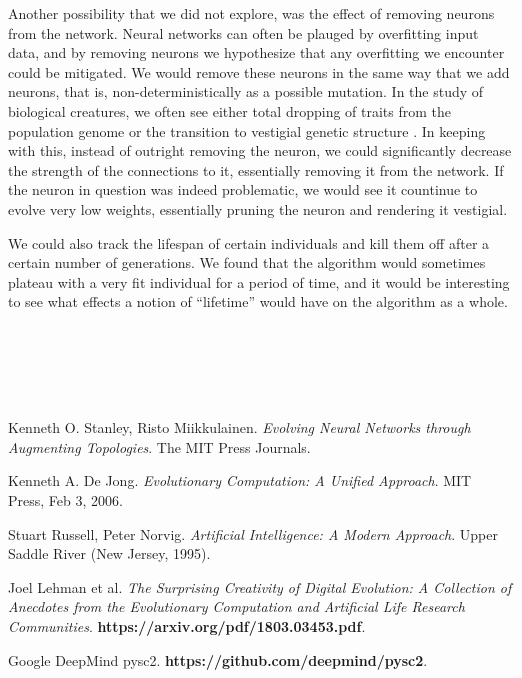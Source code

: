 \documentclass{article}
\begin{document}
\begin{multicols}{2}
Another possibility that we did not explore, was the effect of removing neurons
from the network. Neural networks can often be plauged by overfitting input
data, and by removing neurons we hypothesize that any overfitting we encounter
could be mitigated. We would remove these neurons in the same way that we add
neurons, that is, non-deterministically as a possible mutation. In the study of
biological creatures, we often see either total dropping of traits from the
population genome or the transition to vestigial genetic structure
\cite{lehman}. In keeping with this, instead of outright removing the neuron, we
could significantly decrease the strength of the connections to it, essentially
removing it from the network. If the neuron in question was indeed problematic,
we would see it countinue to evolve very low weights, essentially pruning the
neuron and rendering it vestigial.

We could also track the lifespan of certain individuals and kill them off after
a certain number of generations. We found that the algorithm would sometimes
plateau with a very fit individual for a period of time, and it would be
interesting to see what effects a notion of ``lifetime'' would have on the
algorithm as a whole.

\end{multicols}

\\~\\
\hline
\\~\\

\begin{thebibliography}{9}
  Kenneth O. Stanley, Risto Miikkulainen.
  \textit{Evolving Neural Networks through Augmenting Topologies}. 
  The MIT Press Journals.

  Kenneth A. De Jong. \textit{Evolutionary Computation: A Unified Approach}.
  MIT Press, Feb 3, 2006.

  Stuart Russell, Peter Norvig.
  \textit{Artificial Intelligence: A Modern Approach}.
  Upper Saddle River (New Jersey, 1995).

  Joel Lehman et al.
  \textit{The Surprising Creativity of Digital Evolution: A Collection of
    Anecdotes from the Evolutionary Computation and Artificial Life Research
    Communities}.
  \textbf{https://arxiv.org/pdf/1803.03453.pdf}.

  Google DeepMind pysc2.
  \textbf{https://github.com/deepmind/pysc2}.

\end{thebibliography}
\end{document}
